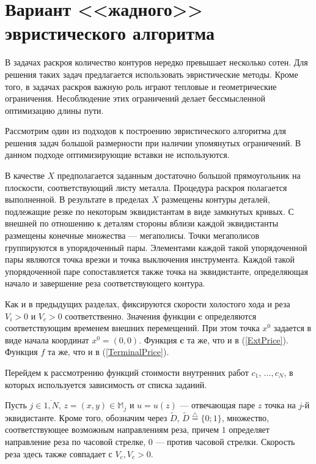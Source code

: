 
\section{
  Вариант <<жадного>> эвристического алгоритма
}
\label{sect:5.6}
\setcounter{equation}{0}

В задачах раскроя количество контуров нередко превышает несколько сотен.
Для решения таких задач предлагается использовать эвристические методы.
Кроме того,
в задачах раскроя важную роль играют тепловые и геометрические ограничения.
Несоблюдение этих ограничений делает бессмысленной
оптимизацию длины пути.

Рассмотрим один из подходов к построению эвристического алгоритма для решения
задач большой размерности при наличии упомянутых ограничений.
В данном подходе оптимизирующие вставки не используются.

В качестве $X$
предполагается заданным достаточно большой прямоугольник на плоскости,
соответствующий листу металла.
Процедура раскроя полагается выполненной.
В результате в пределах $X$ размещены контуры деталей,
подлежащие резке по некоторым эквидистантам в виде замкнутых кривых.
С внешней по отношению к деталям стороны вблизи каждой эквидистанты
размещены конечные множества --- мегаполисы.
Точки мегаполисов группируются в упорядоченный пары.
Элементами каждой такой упорядоченной пары являются точка
врезки и точка выключения инструмента.
Каждой такой упорядоченной паре сопоставляется также точка на эквидистанте,
определяющая начало и завершение реза соответствующего контура.

Как и в предыдущих разделах,
фиксируются скорости холостого хода и реза
$V_i>0$ и $V_c>0$ соответственно.
Значения функции $\mathbf{c}$
определяются соответствующим временем внешних перемещений.
При этом точка
$x^0$ задается в виде начала координат
$x^0=(0,0)$.
Функция $\mathbf{c}$
та же, что и в (\ref{ExtPrice}).
Функция $f$ та же, что и в
(\ref{TerminalPrice}).

Перейдем к рассмотрению функций стоимости внутренних работ
$c_1,\,\dots,c_N$,
в которых используется зависимость от списка заданий.

Пусть
$j\in \overline{1,N}$,
$z=(x,y)\in \mathbb{M}_j$ и
$u=u(z)$ --- отвечающая паре $z$ точка на $j$-й эквидистанте.
Кроме того, обозначим через
$\tilde{D}$,
$\tilde{D}\stackrel{\triangle}{=}\{0;1\}$,
множество, соответствующее возможным направлениям реза,
причем $1$
определяет направление реза по часовой стрелке,
$0$ --- против часовой стрелки.
Скорость реза здесь также совпадает с $V_c, V_c>0$.

